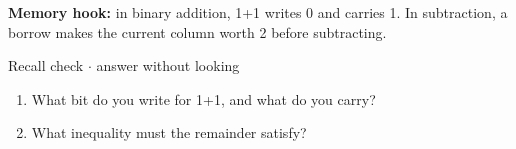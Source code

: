 \documentclass[11pt]{article}
\begin{document}
\begin{keepsection}
\begin{keepsection}
\begin{notebox}\textbf{Memory hook:} in binary addition, 1+1 writes 0 and carries 1. In subtraction, a borrow makes the current column worth 2 before subtracting.\end{notebox}

\begin{recallbox}{Recall check \ensuremath{\cdot} answer without looking}
\begin{enumerate}
\item What bit do you write for 1+1, and what do you carry?
\item What inequality must the remainder satisfy?
\end{enumerate}

\end{recallbox}
\end{keepsection}
\end{keepsection}
\end{document}
